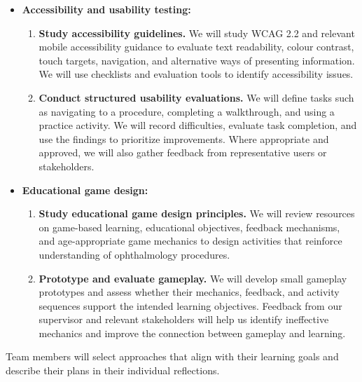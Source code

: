 \documentclass[10pt]{article}
\begin{document}
\begin{enumerate}
\begin{itemize}
\begin{enumerate}
            \item \textbf{Build small technical prototypes.}
            We will implement individual features before integrating
            them into the application to practise using the framework
            and identify technical, integration, and compatibility issues.
        \end{enumerate}

        \item \textbf{Accessibility and usability testing:}
        \begin{enumerate}
            \item \textbf{Study accessibility guidelines.}
            We will study WCAG 2.2 and relevant mobile accessibility
            guidance to evaluate text readability, colour contrast,
            touch targets, navigation, and alternative ways of presenting
            information. We will use checklists and evaluation tools
            to identify accessibility issues.

            \item \textbf{Conduct structured usability evaluations.}
            We will define tasks such as navigating to a procedure,
            completing a walkthrough, and using a practice activity.
            We will record difficulties, evaluate task completion,
            and use the findings to prioritize improvements. Where
            appropriate and approved, we will also gather feedback
            from representative users or stakeholders.
        \end{enumerate}

        \item \textbf{Educational game design:}
        \begin{enumerate}
            \item \textbf{Study educational game design principles.}
            We will review resources on game-based learning, educational
            objectives, feedback mechanisms, and age-appropriate game
            mechanics to design activities that reinforce understanding
            of ophthalmology procedures.

            \item \textbf{Prototype and evaluate gameplay.}
            We will develop small gameplay prototypes and assess whether
            their mechanics, feedback, and activity sequences support
            the intended learning objectives. Feedback from our supervisor
            and relevant stakeholders will help us identify ineffective
            mechanics and improve the connection between gameplay
            and learning.
        \end{enumerate}
    \end{itemize}

    Team members will select approaches that align with their learning
    goals and describe their plans in their individual reflections.
    \end{enumerate}
\end{document}
